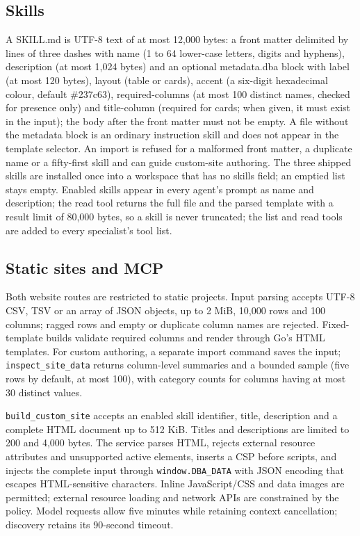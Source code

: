 \documentclass[11pt,a4paper]{article}
\begin{document}
\subsection{Skills}\label{skills}

A SKILL.md is UTF-8 text of at most 12,000 bytes: a front matter
delimited by lines of three dashes with name (1 to 64 lower-case
letters, digits and hyphens), description (at most 1,024 bytes) and an
optional metadata.dba block with label (at most 120 bytes), layout
(table or cards), accent (a six-digit hexadecimal colour, default
\#237c63), required-columns (at most 100 distinct names, checked for
presence only) and title-column (required for cards; when given, it
must exist in the input); the body after the front matter must not be
empty. A file without the metadata block is an ordinary instruction
skill and does not appear in the template selector. An import is
refused for a malformed front matter, a duplicate name or a fifty-first
skill and can guide custom-site authoring. The three shipped skills are
installed once into a workspace that
has no skills field; an emptied list stays empty. Enabled skills appear
in every agent's prompt as name and description; the read tool returns
the full file and the parsed template with a result limit of 80,000
bytes, so a skill is never truncated; the list and read tools are added
to every specialist's tool list.

\subsection{Static sites and MCP}\label{static-sites-and-mcp}

Both website routes are restricted to static projects. Input parsing
accepts UTF-8 CSV, TSV or an array of JSON objects, up to 2 MiB, 10,000
rows and 100 columns; ragged rows and empty or duplicate column names
are rejected. Fixed-template builds validate required columns and render
through Go's HTML templates. For custom authoring, a separate import
command saves the input; \texttt{inspect\_site\_data} returns column-level
summaries and a bounded sample (five rows by default, at most 100), with
category counts for columns having at most 30 distinct values.

\texttt{build\_custom\_site} accepts an enabled skill identifier, title,
description and a complete HTML document up to 512 KiB. Titles and
descriptions are limited to 200 and 4,000 bytes. The service parses HTML,
rejects external resource attributes and unsupported active elements,
inserts a CSP before scripts, and injects the complete input through
\texttt{window.DBA\_DATA} with JSON encoding that escapes HTML-sensitive
characters. Inline JavaScript/CSS and data images are permitted; external
resource loading and network APIs are constrained by the policy. Model
requests allow five minutes while retaining context cancellation;
discovery retains its 90-second timeout.
\end{document}
